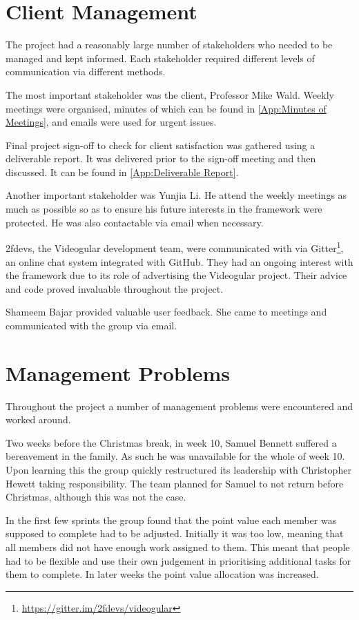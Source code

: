 \section{Client Management}
\label{Section:Client Management}

The project had a reasonably large number of stakeholders who needed to be managed and kept informed. Each stakeholder required different levels of communication via different methods.

The most important stakeholder was the client, Professor Mike Wald. Weekly meetings were organised, minutes of which can be found in \cref{App:Minutes of Meetings}, and emails were used for urgent issues.

Final project sign-off to check for client satisfaction was gathered using a deliverable report. It was delivered prior to the sign-off meeting and then discussed. It can be found in \cref{App:Deliverable Report}.

Another important stakeholder was Yunjia Li. He attend the weekly meetings as much as possible so as to ensure his future interests in the framework were protected. He was also contactable via email when necessary.

2fdevs, the Videogular development team, were communicated with via Gitter\footnote{\url{https://gitter.im/2fdevs/videogular}}, an online chat system integrated with GitHub. They had an ongoing interest with the framework due to its role of advertising the \gls{Videogular} project. Their advice and code proved invaluable throughout the project.

Shameem Bajar provided valuable user feedback. She came to meetings and communicated with the group via email.

\section{Management Problems}

Throughout the project a number of management problems were encountered and worked around.

Two weeks before the Christmas break, in week 10, Samuel Bennett suffered a bereavement in the family. As such he was unavailable for the whole of week 10. Upon learning this the group quickly restructured its leadership with Christopher Hewett taking responsibility. The team planned for Samuel to not return before Christmas, although this was not the case.

In the first few sprints the group found that the point value each member was supposed to complete had to be adjusted. Initially it was too low, meaning that all members did not have enough work assigned to them. This meant that people had to be flexible and use their own judgement in prioritising additional tasks for them to complete. In later weeks the point value allocation was increased.


